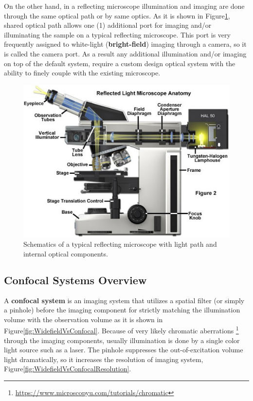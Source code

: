 On the other hand, in a reflecting microscope illumination and imaging are done through the
same optical path or by same optics. As it is shown in Figure\ref{fig:ReflectingMicroscope},
shared optical path allows one (1) additional port for imaging and/or illuminating the sample
on a typical reflecting microscope. This port is very frequently assigned to white-light
(\textbf{bright-field}) imaging through a camera, so it is called the camera port. As a result
any additional illumination and/or imaging on top of the default system, require a custom
design optical system with the ability to finely couple with the existing microscope.

\begin{figure}[H]
	\centering
	\includegraphics[angle=0,origin=c,width = 1.0\linewidth]{Section_Microscope/Figures/ReflectingMicroscope.jpeg}
	\caption{Schematics of a typical reflecting microscope with light path and internal 
		optical components.}
	\label{fig:ReflectingMicroscope}
\end{figure}

\subsection{Confocal Systems Overview}
A \textbf{confocal system} is an imaging system that utilizes a spatial filter
(or simply a pinhole) before the imaging component for strictly matching the illumination 
volume with the observation volume as it is shown in Figure\ref{fig:WidefieldVsConfocal}. Because 
of very likely chromatic aberrations \footnote{\url{https://www.microscopyu.com/tutorials/chromatic}} 
through the imaging components, usually illumination is done by a single color light source such as 
a laser. The pinhole suppresses the out-of-excitation volume light dramatically, so it increases 
the resolution of imaging system, Figure\ref{fig:WidefieldVsConfocalResolution}. 

